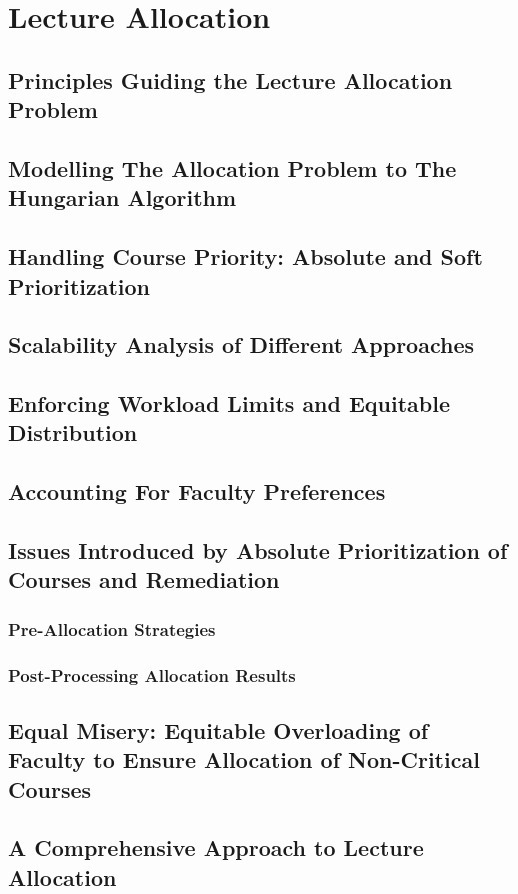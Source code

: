 
\chapter{Lecture Allocation}

\section{Principles Guiding the Lecture Allocation Problem}

\section{Modelling The Allocation Problem to The Hungarian Algorithm}

\section{Handling Course Priority: Absolute and Soft Prioritization}

\section{Scalability Analysis of Different Approaches}

\section{Enforcing Workload Limits and Equitable Distribution}

\section{Accounting For Faculty Preferences}

\section{Issues Introduced by Absolute Prioritization of Courses and Remediation}

\subsection{Pre-Allocation Strategies}

\subsection{Post-Processing Allocation Results}

\section{Equal Misery: Equitable Overloading of Faculty to Ensure Allocation of Non-Critical Courses}

\section{A Comprehensive Approach to Lecture Allocation}
